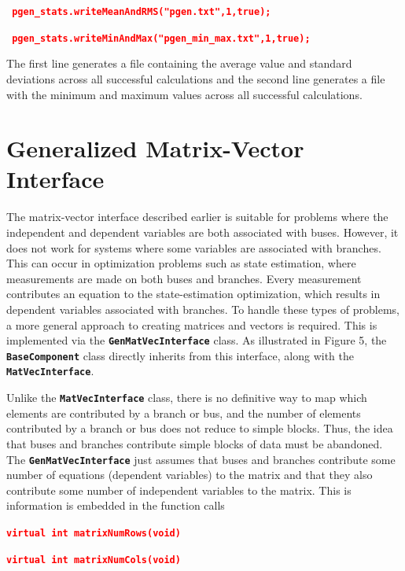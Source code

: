 \documentclass[12pt]{report} %
\begin{document}
\textcolor{red}{\texttt{\textbf{    pgen\_stats.writeMeanAndRMS("pgen.txt",1,true);}}}

\textcolor{red}{\texttt{\textbf{    pgen\_stats.writeMinAndMax("pgen\_min\_max.txt",1,true);}}}

The first line generates a file containing the average value and standard deviations across all successful calculations and the second line generates a file with the minimum and maximum values across all successful calculations.

\chapter{Generalized Matrix-Vector Interface}

The matrix-vector interface described earlier is suitable for problems where the independent and dependent variables are both associated with buses. However, it does not work for systems where some variables are associated with branches. This can occur in optimization problems such as state estimation, where measurements are made on both buses and branches. Every measurement contributes an equation to the state-estimation optimization, which results in dependent variables associated with branches. To handle these types of problems, a more general approach to creating matrices and vectors is required. This is implemented via the \texttt{\textbf{GenMatVecInterface}} class. As illustrated in Figure 5, the \texttt{\textbf{BaseComponent}} class directly inherits from this interface, along with the \texttt{\textbf{MatVecInterface}}. 

Unlike the \texttt{\textbf{MatVecInterface}} class, there is no definitive way to map which elements are contributed by a branch or bus, and the number of elements contributed by a branch or bus does not reduce to simple blocks. Thus, the idea that buses and branches contribute simple blocks of data must be abandoned. The \texttt{\textbf{GenMatVecInterface}} just assumes that buses and branches contribute some number of equations (dependent variables) to the matrix and that they also contribute some number of independent variables to the matrix. This is information is embedded in the function calls

\textcolor{red}{\texttt{\textbf{virtual int matrixNumRows(void)}}}

\textcolor{red}{\texttt{\textbf{virtual int matrixNumCols(void)}}}
\end{document}
